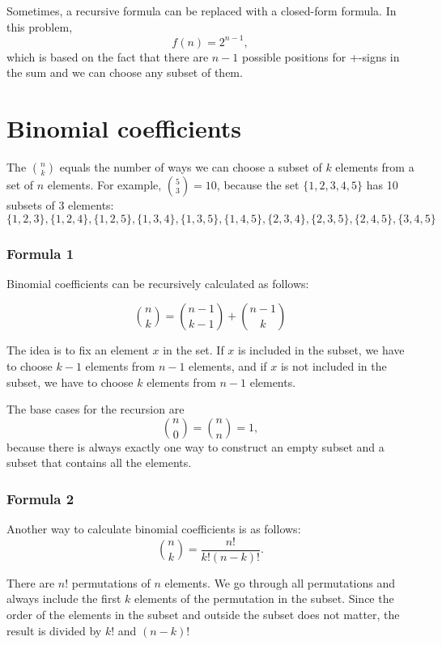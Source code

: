 Sometimes, a recursive formula can be replaced
with a closed-form formula.
In this problem,
\[
f(n)=2^{n-1},
\]
which is based on the fact that there are $n-1$
possible positions for +-signs in the sum
and we can choose any subset of them.

\section{Binomial coefficients}


The  ${n \choose k}$
equals the number of ways we can choose a subset
of $k$ elements from a set of $n$ elements.
For example, ${5 \choose 3}=10$,
because the set $\{1,2,3,4,5\}$
has 10 subsets of 3 elements:
\[ \{1,2,3\}, \{1,2,4\}, \{1,2,5\}, \{1,3,4\}, \{1,3,5\}, 
\{1,4,5\}, \{2,3,4\}, \{2,3,5\}, \{2,4,5\}, \{3,4,5\} \]

\subsubsection{Formula 1}

Binomial coefficients can be
recursively calculated as follows:

\[
{n \choose k}  =  {n-1 \choose k-1} + {n-1 \choose k}
\]

The idea is to fix an element $x$ in the set.
If $x$ is included in the subset,
we have to choose $k-1$
elements from $n-1$ elements,
and if $x$ is not included in the subset,
we have to choose $k$ elements from $n-1$ elements.

The base cases for the recursion are
\[
{n \choose 0}  =  {n \choose n} = 1,
\]
because there is always exactly
one way to construct an empty subset
and a subset that contains all the elements.

\subsubsection{Formula 2}

Another way to calculate binomial coefficients is as follows:
\[
{n \choose k}  =  \frac{n!}{k!(n-k)!}.
\]

There are $n!$ permutations of $n$ elements.
We go through all permutations and always
include the first $k$ elements of the permutation
in the subset.
Since the order of the elements in the subset
and outside the subset does not matter,
the result is divided by $k!$ and $(n-k)!$

